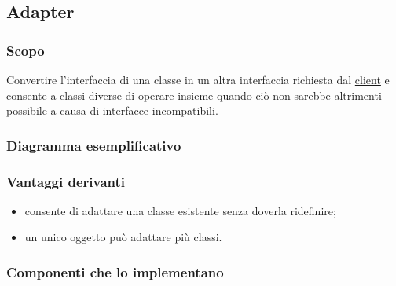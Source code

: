 
\subsection{Adapter}
\subsubsection{Scopo}
Convertire l'interfaccia di una classe in un altra interfaccia richiesta dal \underline{client} e consente a classi diverse di operare insieme quando ciò non sarebbe altrimenti possibile a causa di interfacce incompatibili.
\subsubsection{Diagramma esemplificativo}
\subsubsection{Vantaggi derivanti}
\begin{itemize}
\item consente di adattare una classe esistente senza doverla ridefinire;
\item un unico oggetto può adattare più classi.
\end{itemize}
\subsubsection{Componenti che lo implementano}

